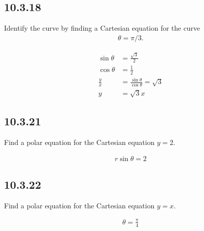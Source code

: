 \documentclass[12pt]{article}
\begin{document}
\subsection*{10.3.18}
Identify the curve by finding a Cartesian equation for the curve
\begin{align*}
  \theta = \pi/3.
\end{align*}

\begin{mdframed}
  \begin{align*}
    \sin\theta &= \frac{\sqrt{3}}{2}\\
    \cos\theta &= \frac{1}{2}\\
    \frac{y}{x} &= \frac{\sin\theta}{\cos\theta} = \sqrt{3}\\
    y &= \sqrt{3}x
  \end{align*}
\end{mdframed}

\subsection*{10.3.21}
Find a polar equation for the Cartesian equation $y = 2$.
\begin{mdframed}
  \begin{align*}
    r\sin\theta = 2
  \end{align*}
\end{mdframed}

\subsection*{10.3.22}
Find a polar equation for the Cartesian equation $y = x$.
\begin{mdframed}
  \begin{align*}
    \theta = \frac{\pi}{4}
  \end{align*}
\end{mdframed}
\end{document}
